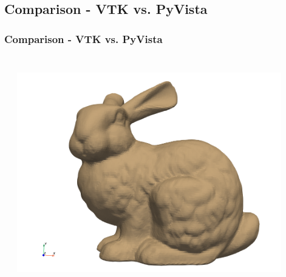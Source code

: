 \documentclass[t]{beamer}
\begin{document}
\subsection{Comparison - VTK vs. PyVista}
\begin{frame}
  \frametitle{Comparison - VTK vs. PyVista}
  \begin{columns}[T]
    \begin{column}{.5\textwidth}
      \vspace{-15pt}
      \inputminted[fontsize=\footnotesize]{python}{code/vtk_example.py}
    \end{column}

    \begin{column}{.5\textwidth}
      \vspace{-15pt}
      \inputminted[fontsize=\footnotesize]{python}{code/pv_example.py}
      \begin{center}
        \includegraphics[width=0.9\textwidth]{figures/pv_example.png}
        \end{center}
    \end{column}
  \end{columns}

\end{frame}


\end{document}
